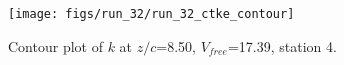\begin{figure}[H]
\centering
\texttt{[image: figs/run\_32/run\_32\_ctke\_contour]}
\caption{Contour plot of $k$ at $z/c$=8.50, $V_{free}$=17.39, station 4.}
\label{fig:run_32_ctke_contour}
\end{figure}


